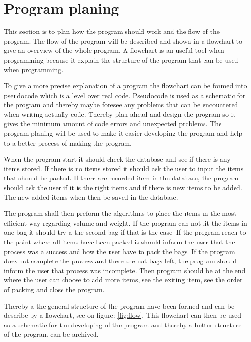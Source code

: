 \section{Program planing}
This section is to plan how the program should work and the flow of the program. The flow of the program will be described and shown in a flowchart to give an overview of the whole program. A flowchart is an useful tool when programming because it explain the structure of the program that can be used when programming.

To give a more precise explanation of a program the flowchart can be formed into pseudocode which is a level over real code. Pseudocode is used as a schematic for the program and thereby maybe foresee any problems that can be encountered when writing actually code. Thereby plan ahead and design the program so it gives the minimum amount of code errors and unexpected problems.
The program planing will be used to make it easier developing the program and help to a better process of making the program.

When the program start it should check the database and see if there is any items stored. If there is no items stored it should ask the user to input the items that should be packed. If there are recorded item in the database, the program should ask the user if it is the right items and if there is new items to be added. The new added items when then be saved in the database.

The program shall then preform the algorithms to place the items in the most efficient way regarding volume and weight. If the program can not fit the items in one bag it should try a the second bag if that is the case. If the program reach to the point where all items have been packed is should inform the user that the process was a success and how the user have to pack the bags. If the program does not complete the process and there are not bags left, the program should inform the user that process was incomplete. Then program should be at the end where the user can choose to add more items, see the exiting item, see the order of packing and close the program.


Thereby a the general structure of the program have been formed and can be describe by a flowchart, see on figure: \ref{fig:flow}.
This flowchart can then be used as a schematic for the developing of the program and thereby a better structure of the program can be archived.